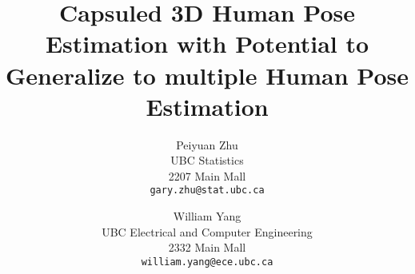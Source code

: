 \documentclass[10pt,twocolumn,letterpaper]{article}
\begin{document}
\title{Capsuled 3D Human Pose Estimation with Potential to Generalize to multiple Human Pose Estimation}

\author{Peiyuan Zhu\\
UBC Statistics\\
2207 Main Mall\\
{\tt\small gary.zhu@stat.ubc.ca}
\and
William Yang\\
UBC Electrical and Computer Engineering\\
2332 Main Mall\\
{\tt\small william.yang@ece.ubc.ca}
}

\maketitle








{
	
	
}
\end{document}
